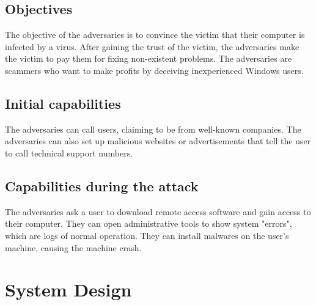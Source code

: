 \documentclass[final]{IEEEtran}
\begin{document}
\subsection{Objectives}
The objective of the adversaries is to convince the victim that their computer is infected by a virus. After gaining the trust of the victim, the adversaries make the victim to pay them for fixing non-existent problems. The adversaries are scammers who want to make profits by deceiving inexperienced Windows users.
\subsection{Initial capabilities}
The adversaries can call users, claiming to be from well-known companies. The adversaries can also set up malicious websites or advertisements that tell the user to call technical support numbers. 
\subsection{Capabilities during the attack}
The adversaries ask a user to download remote access software and gain access to their computer. They can open administrative tools to show system "errors", which are logs of normal operation. They can install malwares on the user's machine, causing the machine crash.

\section{System Design} %
\end{document}
